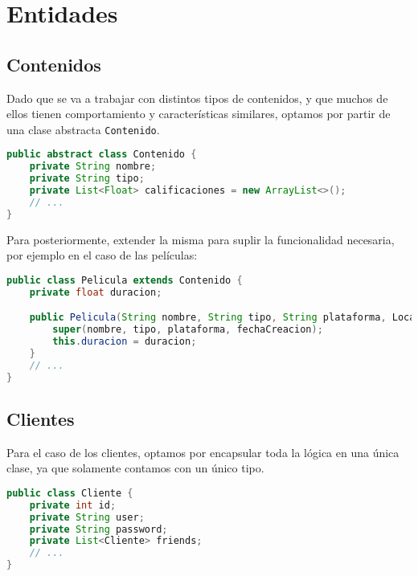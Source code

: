 ﻿\section{Entidades}\label{sec:entidades}

\subsection{Contenidos}\label{subsec:contenidos}
Dado que se va a trabajar con distintos tipos de contenidos, y que muchos de ellos tienen comportamiento y características
similares, optamos por partir de una clase abstracta \lstinline|Contenido|.
\begin{lstlisting}[language=Java, caption={Vistazo de la clase abstracta.}]
public abstract class Contenido {
    private String nombre;
    private String tipo;
    private List<Float> calificaciones = new ArrayList<>();
    // ...
}
\end{lstlisting}
Para posteriormente, extender la misma para suplir la funcionalidad necesaria, por ejemplo en el caso de las películas:
\begin{lstlisting}[language=Java, caption={Vistazo de una implementación de la clase abstracta.}]
public class Pelicula extends Contenido {
    private float duracion;

    public Pelicula(String nombre, String tipo, String plataforma, LocalDateTime fechaCreacion, float duracion) {
        super(nombre, tipo, plataforma, fechaCreacion);
        this.duracion = duracion;
    }
    // ...
}
\end{lstlisting}

\subsection{Clientes}\label{subsec:clientes}
Para el caso de los clientes, optamos por encapsular toda la lógica en una única clase, ya que solamente contamos con un
único tipo.
\begin{lstlisting}[language=Java, caption={Vistazo de la implementación del cliente.}]
public class Cliente {
    private int id;
    private String user;
    private String password;
    private List<Cliente> friends;
    // ...
}
\end{lstlisting}


